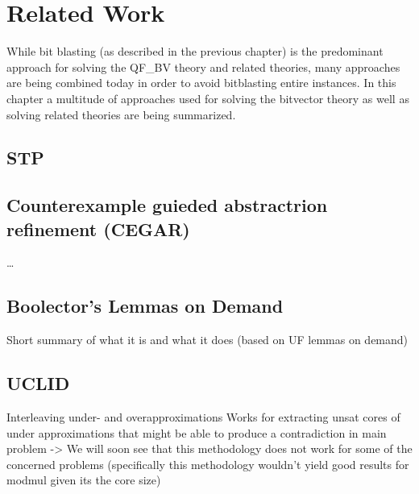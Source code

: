 \chapter{Related Work}
\label{ch:related_work}
While bit blasting (as described in the previous chapter) is the predominant approach for solving the QF\_BV theory and related theories, many approaches are being combined today in order to avoid bitblasting entire instances.
In this chapter a multitude of approaches used for solving the bitvector theory as well as solving related theories are being summarized. 

\section{STP}

\section{Counterexample guieded abstractrion refinement (CEGAR)}
\dots
\section{Boolector's Lemmas on Demand}
Short summary of what it is and what it does (based on UF lemmas on demand)
\section{UCLID}
Interleaving under- and overapproximations
Works for extracting unsat cores of under approximations that might be able to produce a contradiction in main problem
-> We will soon see that this methodology does not work for some of the concerned problems (specifically this methodology wouldn't yield good results for modmul given its the core size)
